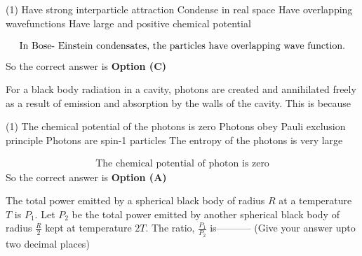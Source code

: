 \begin{enumerate}
\begin{tasks}(1)
\task[\textbf{A.}] Have strong interparticle attraction
\task[\textbf{B.}] Condense in real space
\task[\textbf{C.}]  Have overlapping wavefunctions
\task[\textbf{D.}] Have large and positive chemical potential
\end{tasks}
\begin{answer}
\begin{align*}
\intertext{In Bose- Einstein condensates, the particles have overlapping wave function.}
\end{align*}
So the correct answer is \textbf{Option (C)}
\end{answer}
\begin{minipage}{\textwidth}
\item For a black body radiation in a cavity, photons are created and annihilated freely as a result of emission and absorption by the walls of the cavity. This is because
{}
\end{minipage}
\begin{tasks}(1)
\task[\textbf{A.}] The chemical potential of the photons is zero
\task[\textbf{B.}] Photons obey Pauli exclusion principle
\task[\textbf{C.}] Photons are spin-1 particles
\task[\textbf{D.}] The entropy of the photons is very large
\end{tasks}
\begin{answer}
\begin{align*}
\text{The chemical potential of photon is zero}
\end{align*}
So the correct answer is \textbf{Option (A)}
\end{answer}
\item The total power emitted by a spherical black body of radius $R$ at a temperature $T$ is $P_{1}$. Let $P_{2}$ be the total power emitted by another spherical black body of radius $\frac{R}{2}$ kept at temperature $2 T$. The ratio, $\frac{P_{1}}{P_{2}}$ is----------- (Give your answer upto two decimal places)
{}


\end{enumerate}
